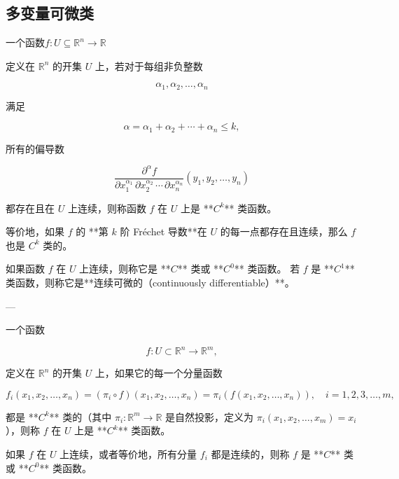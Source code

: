 \subsection{多变量可微类}
一个函数$f: U \subseteq \mathbb{R}^n \to \mathbb{R}$

定义在 $\mathbb{R}^n$ 的开集 $U$ 上，若对于每组非负整数

$$
\alpha_1, \alpha_2, \ldots, \alpha_n
$$

满足

$$
\alpha = \alpha_1 + \alpha_2 + \cdots + \alpha_n \le k,
$$

所有的偏导数

$$
\frac{\partial^\alpha f}{\partial x_1^{\alpha_1}\,\partial x_2^{\alpha_2}\,\cdots\,\partial x_n^{\alpha_n}}(y_1, y_2, \ldots, y_n)
$$

都存在且在 $U$ 上连续，则称函数 $f$ 在 $U$ 上是 **$C^k$** 类函数。

等价地，如果 $f$ 的 **第 $k$ 阶 Fréchet 导数**在 $U$ 的每一点都存在且连续，那么 $f$ 也是 $C^k$ 类的。

如果函数 $f$ 在 $U$ 上连续，则称它是 **$C$** 类或 **$C^0$** 类函数。
若 $f$ 是 **$C^1$** 类函数，则称它是**连续可微的（continuously differentiable）**。

---

一个函数

$$
f: U \subset \mathbb{R}^n \to \mathbb{R}^m,
$$

定义在 $\mathbb{R}^n$ 的开集 $U$ 上，如果它的每一个分量函数

$$
f_i(x_1, x_2, \ldots, x_n)
= (\pi_i \circ f)(x_1, x_2, \ldots, x_n)
= \pi_i(f(x_1, x_2, \ldots, x_n)), \quad i=1,2,3,\ldots,m,
$$

都是 **$C^k$** 类的（其中 $\pi_i: \mathbb{R}^m \to \mathbb{R}$ 是自然投影，定义为 $\pi_i(x_1, x_2, \ldots, x_m) = x_i$），则称 $f$ 在 $U$ 上是 **$C^k$** 类函数。

如果 $f$ 在 $U$ 上连续，或者等价地，所有分量 $f_i$ 都是连续的，则称 $f$ 是 **$C$** 类或 **$C^0$** 类函数。
